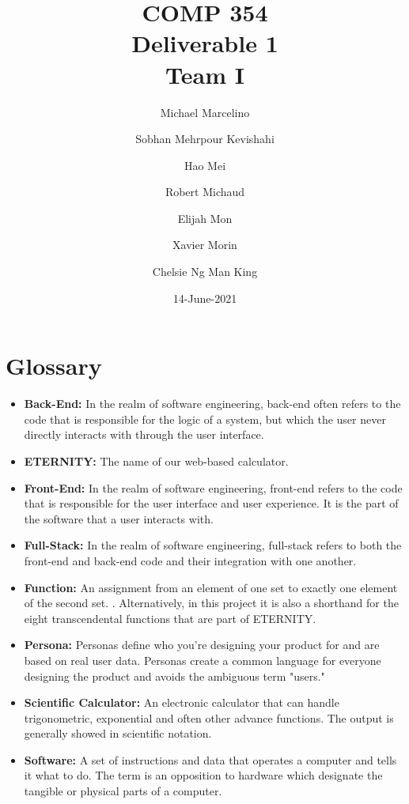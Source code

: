\documentclass[11pt,onside]{report}
\title{\blue COMP 354 \\
\blueb Deliverable 1 \\ \blue Team I}
\author{
  Michael Marcelino \and
  Sobhan Mehrpour Kevishahi \and
  Hao Mei \and 
  Robert Michaud \and
  Elijah Mon \and
  Xavier Morin \and
  Chelsie Ng Man King}
\date{14-June-2021} %
\begin{document}
\maketitle
\tableofcontents{}
\newpage
\section{Glossary}

\begin{itemize}
    
    \item \textbf{Back-End:} In the realm of software engineering, back-end often refers to the code that is responsible for the logic of a system, but which the user never directly interacts with through the user interface. \cite{sonmez_2017}
    
    \item \textbf{ETERNITY:} The name of our web-based calculator. 
    
    \item \textbf{Front-End:} In the realm of software engineering, front-end refers to the code that is responsible for the user interface and user experience. It is the part of the software that a user interacts with. \cite{naor_2021}
    
    \item \textbf{Full-Stack:} In the realm of software engineering, full-stack refers to both the front-end and back-end code and their integration with one another.

    \item \textbf{Function:} An assignment from an element of one set to exactly one element of the second set. \cite{function}. Alternatively, in this project it is also a shorthand for the eight transcendental functions that are part of ETERNITY.
    
    \item \textbf{Persona:} Personas define who you're designing your product for and are based on real user data. Personas create a common language for everyone designing the product and avoids the ambiguous term "users." \cite{personas}
    
    \item \textbf{Scientific Calculator:}  An electronic calculator that can handle trigonometric, exponential and often other advance functions. The output is generally showed in scientific notation. \cite{scientific}
    
    \item \textbf{Software:} A set of instructions and data that operates a computer and tells it what to do. \cite{software}  The term is an opposition to hardware which designate the tangible or physical parts of a computer. 
    

\end{itemize}
\end{document}
